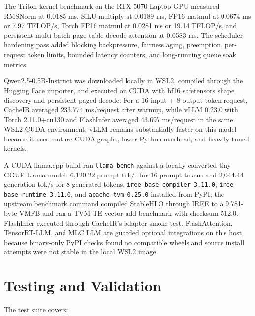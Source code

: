 \documentclass[11pt]{article}
\begin{document}
The Triton kernel benchmark on the RTX 5070 Laptop GPU measured RMSNorm at
0.0185 ms, SiLU-multiply at 0.0189 ms, FP16 matmul at 0.0674 ms or
7.97 TFLOP/s, Torch FP16 matmul at 0.0281 ms or 19.14 TFLOP/s, and persistent
multi-batch page-table decode attention at 0.0583 ms. The scheduler hardening
pass added blocking backpressure, fairness aging, preemption, per-request token
limits, bounded latency counters, and long-running queue soak metrics.

Qwen2.5-0.5B-Instruct was downloaded locally in WSL2, compiled through the
Hugging Face importer, and executed on CUDA with bf16 safetensors shape
discovery and persistent paged decode. For a 16 input + 8 output token request,
CacheIR averaged 233.774 ms/request after warmup, while vLLM 0.23.0 with Torch
2.11.0+cu130 and FlashInfer averaged 43.697 ms/request in the same WSL2 CUDA
environment. vLLM remains substantially faster on this model because it uses
mature CUDA graphs, lower Python overhead, and heavily tuned kernels.

A CUDA llama.cpp build ran \texttt{llama-bench} against a locally converted tiny
GGUF Llama model: 6,120.22 prompt tok/s for 16 prompt tokens and 2,044.44
generation tok/s for 8 generated tokens. \texttt{iree-base-compiler 3.11.0},
\texttt{iree-base-runtime 3.11.0}, and \texttt{apache-tvm 0.25.0} installed from
PyPI; the upstream benchmark command compiled StableHLO through IREE to a
9,781-byte VMFB and ran a TVM TE vector-add benchmark with checksum 512.0.
FlashInfer executed through CacheIR's adapter smoke test. FlashAttention,
TensorRT-LLM, and MLC LLM are guarded optional integrations on this host because
binary-only PyPI checks found no compatible wheels and source install attempts
were not stable in the local WSL2 image.

\section{Testing and Validation}

The test suite covers:
\end{document}
